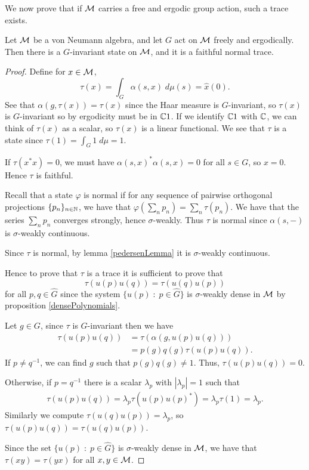 We now prove that if $\mathcal{M}$ carries a free and ergodic group action, such a trace exists.
\begin{lemma}
    Let $\mathcal{M}$ be a von Neumann algebra, and let $G$ act on $\mathcal{M}$ freely and ergodically.
    Then there is a $G$-invariant state on $\mathcal{M}$, and it is a faithful normal
    trace.
\end{lemma}
\begin{proof}
    Define for $x \in \mathcal{M}$, 
    \begin{equation}
        \tau(x) = \int_G \alpha(s,x)\;d\mu(s) = \hat{x}(0).
    \end{equation}
    See that $\alpha(g,\tau(x)) = \tau(x)$ since the Haar
    measure is $G$-invariant, so $\tau(x)$
    is $G$-invariant so by ergodicity must be in $\mathbb{C} 1$. If we identify
    $\mathbb{C} 1$ with $\mathbb{C}$, we can think of $\tau(x)$ as a scalar, so $\tau(x)$
    is a linear functional. We see that $\tau$ is a state since $\tau(1) = \int_G 1\;d\mu = 1$.   
    
    If $\tau(x^*x) = 0$, we must have $\alpha(s,x)^*\alpha(s,x) = 0$
    for all $s \in G$, so $x = 0$. Hence $\tau$ is faithful.
    
    Recall that a state $\varphi$ is normal if for any sequence of 
    pairwise orthogonal projections $\{p_n\}_{n \in \mathbb{N}}$, we have
    that $\varphi(\sum_{n} p_n) = \sum_{n} \tau(p_n)$. 
    We have that the series $\sum_n p_n$ converges strongly, hence
    $\sigma$-weakly. Thus $\tau$ is normal since $\alpha(s,-)$
    is $\sigma$-weakly continuous.
    
    
    Since $\tau$ is normal, by lemma \ref{pedersenLemma} it is $\sigma$-weakly continuous.
    
    Hence to prove that $\tau$ is a trace it is sufficient to prove that
    \begin{equation}
        \tau(u(p)u(q)) = \tau(u(q)u(p))
    \end{equation}
    for all $p,q \in \widehat{G}$ since the system $\{u(p)\;:\; p \in \widehat{G}\}$
    is $\sigma$-weakly dense in $\mathcal{M}$ by proposition \ref{densePolynomials}.
    
    Let $g \in G$, since $\tau$ is $G$-invariant then we have
    \begin{align}
        \tau(u(p)u(q)) &= \tau(\alpha(g,u(p)u(q)))\\
        &= p(g)q(g)\tau(u(p)u(q)).
    \end{align}
    If $p \neq q^{-1}$, we can find $g$ such that $p(g)q(g) \neq 1$. Thus,
    $\tau(u(p)u(q)) = 0$.
    
    Otherwise, if $p = q^{-1}$ there is a scalar $\lambda_p$
    with $|\lambda_p| = 1$ such that
    \begin{align}
        \tau(u(p)u(q)) = \lambda_p\tau(u(p)u(p)^*) = \lambda_p\tau(1) = \lambda_p.
    \end{align}
    Similarly we compute $\tau(u(q)u(p)) = \lambda_p$, so $\tau(u(p)u(q)) = \tau(u(q)u(p))$.
    
    Since the set $\{u(p)\;:\;p \in \widehat{G}\}$ is $\sigma$-weakly
    dense in $\mathcal{M}$, we have that $\tau(xy) = \tau(yx)$ for all $x,y \in \mathcal{M}$.
    
\end{proof} 


